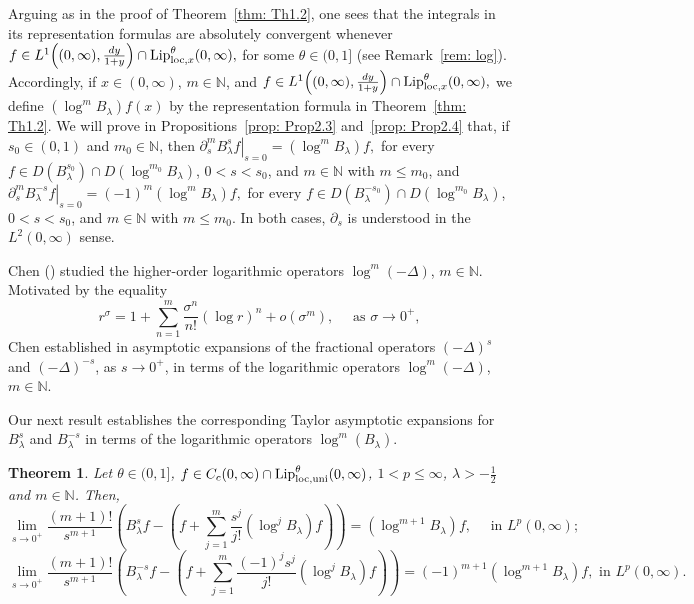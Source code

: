 \documentclass[a4paper,10pt, reqno]{amsart}
\newtheorem{thm}{Theorem}[section]
\theoremstyle{definition}
\theoremstyle{remark}
\numberwithin{equation}{section}
\begin{document}
Arguing as in the proof of Theorem~\ref{thm: Th1.2}, one sees that the integrals in its representation formulas are absolutely convergent whenever $f\in L^1\!\left((0,\infty),\frac{dy}{1+y}\right)\cap
{\textup{Lip}}^\theta_{{\rm loc},x}(0,\infty),$
for some $\theta\in(0,1]$ (see Remark~\ref{rem: log}). Accordingly, if $x\in(0,\infty)$, $m\in\mathbb N$, and
$f\in L^1\!\left((0,\infty),\frac{dy}{1+y}\right)\cap
{\textup{Lip}}^\theta_{{\rm loc},x}(0,\infty),$
we define $(\log^m B_\lambda)f(x)$ by the representation formula in Theorem~\ref{thm: Th1.2}.
We will prove in Propositions~\ref{prop: Prop2.3} and~\ref{prop: Prop2.4} that, if $s_0\in(0,1)$ and $m_0\in\mathbb N$, then $\left.\partial_s^m B_\lambda^sf\right|_{s=0}
=(\log^mB_\lambda)f,$
for every $f\in D(B_\lambda^{s_0})\cap D(\log^{m_0}B_\lambda)$, $0<s<s_0$, and $m\in\mathbb N$ with $m\le m_0$, and
$\left.\partial_s^m B_\lambda^{-s}f\right|_{s=0}
=(-1)^m(\log^m B_\lambda)f,$
for every $f\in D(B_\lambda^{-s_0})\cap D(\log^{m_0}B_\lambda)$, $0<s<s_0$, and $m\in\mathbb N$ with $m\le m_0$. In both cases, $\partial_s$ is understood in the $L^2(0,\infty)$ sense.

Chen (\cite{Ch}) studied the higher-order logarithmic operators $\log^m(-\Delta)$, $m\in \mathbb N$. Motivated by the equality
\[
r^\sigma =1+\sum_{n=1}^m\frac{\sigma^n}{n!}(\log r)^n+o(\sigma ^m),\quad \mbox{ as }\sigma \rightarrow 0^+,
\]
Chen established in \cite[Theorems~1.1 and~1.2]{Ch} asymptotic expansions of the fractional operators $(-\Delta)^s$ and $(-\Delta )^{-s}$, as $s\rightarrow 0^+$, in terms of the logarithmic operators $\log^m(-\Delta)$, $m\in \mathbb N$.

Our next result establishes the corresponding Taylor asymptotic expansions for $B_\lambda^s$ and $B_\lambda^{-s}$ in terms of the logarithmic operators $\log^m(B_\lambda)$.

\begin{thm}\label{thm: Th1.3}
Let $\theta \in (0,1]$, $f\in C_c(0,\infty)\cap {\textup{Lip}}^\theta _{{\rm loc},{\rm uni}}(0,\infty)$, $1<p\leq \infty $, $\lambda >-\tfrac12$ and $m\in \mathbb N$. Then,
\[\lim_{s\rightarrow 0^+}\frac{(m+1)!}{s^{m+1}}\left(B_\lambda^sf-\left(f+\sum_{j=1}^m\frac{s^j}{j!}(\log^jB_\lambda)f \right)\right)=(\log^{m+1}B_\lambda)f,\quad \mbox{ in }L^p(0,\infty);\]
\[\lim_{s\rightarrow 0^+}\frac{(m+1)!}{s^{m+1}}\left(B_\lambda^{-s}f-\left(f+\sum_{j=1}^m\frac{(-1)^js^j}{j!}(\log^jB_\lambda)f\right)\right)=(-1)^{m+1}(\log^{m+1}B_\lambda)f, \mbox{ in }L^p(0,\infty).\]
\end{thm}
\end{document}
